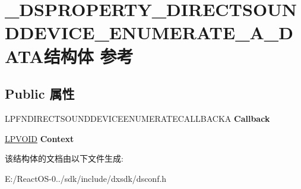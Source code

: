 \hypertarget{struct___d_s_p_r_o_p_e_r_t_y___d_i_r_e_c_t_s_o_u_n_d_d_e_v_i_c_e___e_n_u_m_e_r_a_t_e___a___d_a_t_a}{}\section{\+\_\+\+D\+S\+P\+R\+O\+P\+E\+R\+T\+Y\+\_\+\+D\+I\+R\+E\+C\+T\+S\+O\+U\+N\+D\+D\+E\+V\+I\+C\+E\+\_\+\+E\+N\+U\+M\+E\+R\+A\+T\+E\+\_\+\+A\+\_\+\+D\+A\+T\+A结构体 参考}
\label{struct___d_s_p_r_o_p_e_r_t_y___d_i_r_e_c_t_s_o_u_n_d_d_e_v_i_c_e___e_n_u_m_e_r_a_t_e___a___d_a_t_a}
\subsection*{Public 属性}
\begin{DoxyCompactItemize}
\item 
\mbox{\label{struct___d_s_p_r_o_p_e_r_t_y___d_i_r_e_c_t_s_o_u_n_d_d_e_v_i_c_e___e_n_u_m_e_r_a_t_e___a___d_a_t_a_a7dba91c9c767d30b3d41bbabfbf38cf9}} 
L\+P\+F\+N\+D\+I\+R\+E\+C\+T\+S\+O\+U\+N\+D\+D\+E\+V\+I\+C\+E\+E\+N\+U\+M\+E\+R\+A\+T\+E\+C\+A\+L\+L\+B\+A\+C\+KA {\bfseries Callback}
\item 
\mbox{\label{struct___d_s_p_r_o_p_e_r_t_y___d_i_r_e_c_t_s_o_u_n_d_d_e_v_i_c_e___e_n_u_m_e_r_a_t_e___a___d_a_t_a_a1090fb89d6c41abf59c4f9157a67d080}} 
\hyperlink{interfacevoid}{L\+P\+V\+O\+ID} {\bfseries Context}
\end{DoxyCompactItemize}


该结构体的文档由以下文件生成\+:\begin{DoxyCompactItemize}
\item 
E\+:/\+React\+O\+S-\/0../sdk/include/dxsdk/dsconf.\+h\end{DoxyCompactItemize}
